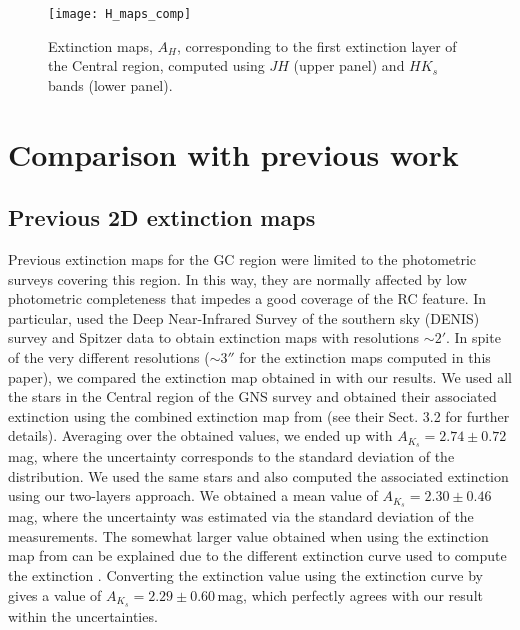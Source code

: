 \documentclass{aa}
\begin{document}





    
       \begin{figure}[t!]
   \texttt{[image: H\_maps\_comp]}
   \caption{Extinction maps, $A_{H}$, corresponding to the first extinction layer of the Central region, computed using $JH$ (upper panel) and $HK_s$ bands (lower panel).}

   \label{AH_maps}
    \end{figure}
    
    
    
\section{Comparison with previous work}    

\subsection{Previous 2D extinction maps}

Previous extinction maps for the GC region were limited to the photometric surveys covering this region. In this way, they are normally affected by low photometric completeness that impedes a good coverage of the RC feature. In particular, \citet{Schultheis:1999te,Schultheis:2009tg} used the Deep Near-Infrared Survey of the southern sky (DENIS) survey and Spitzer data to obtain extinction maps with resolutions $\sim2'$. In spite of the very different resolutions ($\sim3''$ for the extinction maps computed in this paper), we compared the extinction map obtained in \citet{Schultheis:2009tg} with our results. We used all the stars in the Central region of the GNS survey and obtained their associated extinction using the combined extinction map from \citet{Schultheis:2009tg} (see their Sect. 3.2 for further details). Averaging over the obtained values, we ended up with $A_{K_s}=2.74\pm0.72$\,mag, where the uncertainty corresponds to the standard deviation of the distribution. We used the same stars and also computed the associated extinction using our two-layers approach. We obtained a mean value of $A_{K_s}=2.30\pm0.46$\,mag, where the uncertainty was estimated via the standard deviation of the measurements. The somewhat larger value obtained when using the extinction map from \citet{Schultheis:2009tg} can be explained due to the different extinction curve used to compute the extinction \citep{Glass:1999vp}. Converting the extinction value using the extinction curve by \citet{Nogueras-Lara:2020aa} gives a value of $A_{K_s}=2.29\pm0.60$\,mag, which perfectly agrees with our result within the uncertainties.
\end{document}
